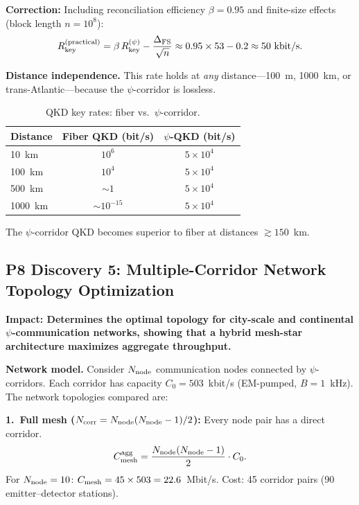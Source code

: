 \documentclass[aps,prd,twocolumn,superscriptaddress,nofootinbib]{revtex4-2}
\begin{document}
\textbf{Correction:} Including reconciliation efficiency
$\beta = 0.95$ and finite-size effects (block length $n = 10^8$):
\begin{equation}
R_{\rm key}^{\rm (practical)} = \beta\,R_{\rm key}^{(\psi)}
- \frac{\Delta_{\rm FS}}{\sqrt{n}}
\approx 0.95\times 53 - 0.2 \approx 50~\text{kbit/s}.
\end{equation}

\textbf{Distance independence.}  This rate holds at \emph{any}
distance---100~m, 1000~km, or trans-Atlantic---because the
$\psi$-corridor is lossless.

\begin{table}[h]
\caption{QKD key rates: fiber vs.\ $\psi$-corridor.}
\begin{ruledtabular}
\begin{tabular}{lcc}
Distance & Fiber QKD (bit/s) & $\psi$-QKD (bit/s) \\
\hline
10~km & $10^6$ & $5\times10^4$ \\
100~km & $10^4$ & $5\times10^4$ \\
500~km & $\sim 1$ & $5\times10^4$ \\
1000~km & $\sim 10^{-15}$ & $5\times10^4$ \\
\end{tabular}
\end{ruledtabular}
\end{table}

The $\psi$-corridor QKD becomes superior to fiber at distances
$\gtrsim 150$~km.

\subsection{P8 Discovery 5: Multiple-Corridor Network Topology
Optimization}

\textbf{Impact: Determines the optimal topology for city-scale and
continental $\psi$-communication networks, showing that a hybrid
mesh-star architecture maximizes aggregate throughput.}

\textbf{Network model.}  Consider $N_{\rm node}$ communication nodes
connected by $\psi$-corridors.  Each corridor has capacity
$C_0 = 503$~kbit/s (EM-pumped, $B = 1$~kHz).  The network topologies
compared are:

\textbf{1.\ Full mesh ($N_{\rm corr} = N_{\rm node}(N_{\rm node}-1)/2$):}
Every node pair has a direct corridor.
\begin{equation}
C_{\rm mesh}^{\rm agg} = \frac{N_{\rm node}(N_{\rm node}-1)}{2}\cdot C_0.
\end{equation}
For $N_{\rm node} = 10$: $C_{\rm mesh} = 45\times 503 = 22.6$~Mbit/s.
Cost: 45 corridor pairs (90 emitter--detector stations).
\end{document}
